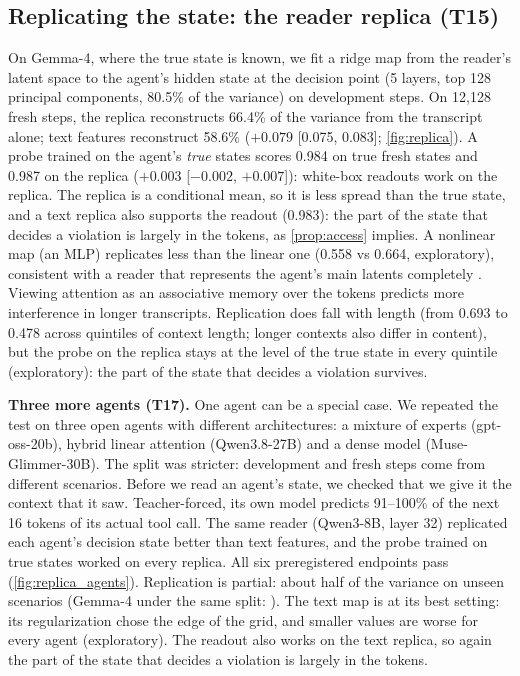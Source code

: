 \documentclass{article}
\begin{document}
\subsection{Replicating the state: the reader replica (T15)}
\label{sec:replica}
On Gemma-4, where the true state is known, we fit a ridge map from the reader's latent space to the agent's hidden state at the decision point (5 layers, top 128 principal components, 80.5\% of the variance) on development steps.
On 12{,}128 fresh steps, the replica reconstructs 66.4\% of the variance from the transcript alone; text features reconstruct 58.6\% ($+0.079$ [0.075, 0.083]; \cref{fig:replica}).
A probe trained on the agent's \emph{true} states scores 0.984 on true fresh states and 0.987 on the replica ($+0.003$ [$-0.002$, $+0.007$]): white-box readouts work on the replica.
The replica is a conditional mean, so it is less spread than the true state, and a text replica also supports the readout (0.983): the part of the state that decides a violation is largely in the tokens, as \cref{prop:access} implies. A nonlinear map (an MLP) replicates less than the linear one (0.558 vs 0.664, exploratory), consistent with a reader that represents the agent's main latents completely \citep{zhou2026identifiabilities}. Viewing attention as an associative memory over the tokens \citep{wang2026memory} predicts more interference in longer transcripts. Replication does fall with length (from 0.693 to 0.478 across quintiles of context length; longer contexts also differ in content), but the probe on the replica stays at the level of the true state in every quintile (exploratory): the part of the state that decides a violation survives.

\textbf{Three more agents (T17).} One agent can be a special case. We repeated the test on three open agents with different architectures: a mixture of experts (gpt-oss-20b), hybrid linear attention (Qwen3.8-27B) and a dense model (Muse-Glimmer-30B). The split was stricter: development and fresh steps come from different scenarios. Before we read an agent's state, we checked that we give it the context that it saw. Teacher-forced, its own model predicts 91--100\% of the next 16 tokens of its actual tool call. The same reader (Qwen3-8B, layer 32) replicated each agent's decision state better than text features, and the probe trained on true states worked on every replica. All six preregistered endpoints pass (\cref{fig:replica_agents}). \REPLAGENTSTEXT{} Replication is partial: about half of the variance on unseen scenarios (Gemma-4 under the same split: \REPLGEMMASPLIT). The text map is at its best setting: its regularization chose the edge of the grid, and smaller values are worse for every agent (exploratory). The readout also works on the text replica, so again the part of the state that decides a violation is largely in the tokens.
\end{document}
